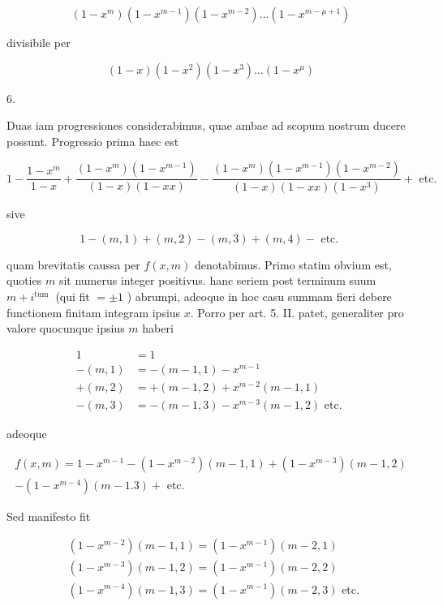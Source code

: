 \documentclass[10pt]{article}
\begin{document}
\[
\left(1-x^{m}\right)\left(1-x^{m-1}\right)\left(1-x^{m-2}\right) \ldots\left(1-x^{m-\mu+1}\right)
\]

divisibile per

\[
(1-x)\left(1-x^{2}\right)\left(1-x^{3}\right) \ldots\left(1-x^{\mu}\right)
\]

6.

Duas iam progressiones considerabimus, quae ambae ad scopum nostrum ducere possunt. Progressio prima haec est

\[
1-\frac{1-x^{m}}{1-x}+\frac{\left(1-x^{m}\right)\left(1-x^{m-1}\right)}{(1-x)(1-x x)}-\frac{\left(1-x^{m}\right)\left(1-x^{m-1}\right)\left(1-x^{m-2}\right)}{(1-x)(1-x x)\left(1-x^{3}\right)}+\text { etc. }
\]

sive

\[
1-(m, 1)+(m, 2)-(m, 3)+(m, 4)-\text { etc. }
\]

quam brevitatis caussa per \(f(x, m)\) denotabimus. Primo statim obvium est, quoties \(m\) sit numerus integer positivus. hanc seriem post terminum suum \(m+i^{\text {tum }}\) (qui fit \(= \pm 1\) ) abrumpi, adeoque in hoc casu summam fieri debere functionem finitam integram ipsius \(x\). Porro per art. 5. II. patet, generaliter pro valore quocunque ipsius \(m\) haberi

\[
\begin{aligned}
1 & =1 \\
-(m, 1) & =-(m-1,1)-x^{m-1} \\
+(m, 2) & =+(m-1,2)+x^{m-2}(m-1,1) \\
-(m, 3) & =-(m-1,3)-x^{m-3}(m-1,2) \text { etc. }
\end{aligned}
\]

adeoque

\[
\begin{gathered}
f(x, m)=1-x^{m-1}-\left(1-x^{m-2}\right)(m-1,1)+\left(1-x^{m-3}\right)(m-1,2) \\
-\left(1-x^{m-4}\right)(m-1.3)+\text { etc. }
\end{gathered}
\]

Sed manifesto fit

\[
\begin{aligned}
& \left(1-x^{m-2}\right)(m-1,1)=\left(1-x^{m-1}\right)(m-2,1) \\
& \left(1-x^{m-3}\right)(m-1,2)=\left(1-x^{m-1}\right)(m-2,2) \\
& \left(1-x^{m-4}\right)(m-1,3)=\left(1-x^{m-1}\right)(m-2,3) \text { etc. }
\end{aligned}
\]
\end{document}
